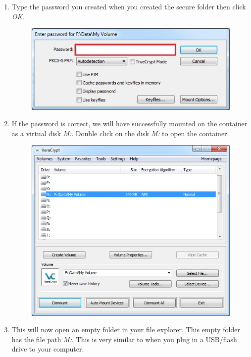 \documentclass{tufte-handout}
\begin{document}
\begin{enumerate}
	\item Type the password you created when you created the secure folder then click \textit{OK}.
	\begin{figure}%
		\includegraphics[width=\linewidth]{img/vc_mount_5.png}
	\end{figure}
	\FloatBarrier
	
	\item If the password is correct, we will have successfully mounted on the container as a virtual disk \textit{M:}. Double click on the disk \textit{M:} to open the container. 
	\begin{figure}%
		\includegraphics[width=\linewidth]{img/vc_mount_6.png}
	\end{figure}
	\FloatBarrier
	
	\item This will now open an empty folder in your file explorer. This empty folder has the file path \textit{M:}. This is very similar to when you plug in a USB/flash drive to your computer. 
	

\end{enumerate}
\end{document}
